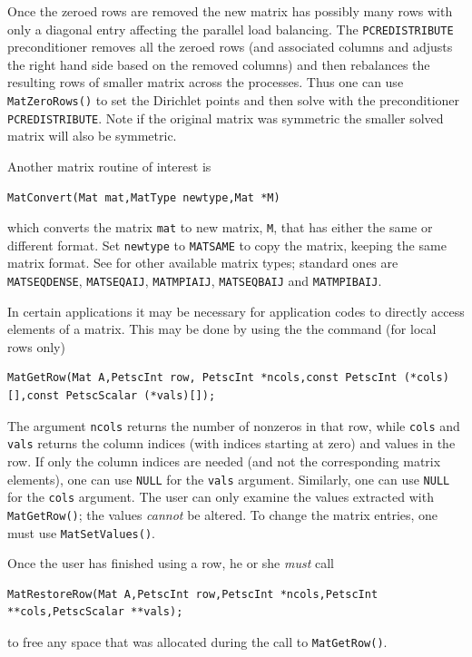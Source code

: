 Once the zeroed rows are removed the new matrix has possibly many rows
with only a diagonal entry affecting the parallel load balancing. The
\lstinline{PCREDISTRIBUTE} preconditioner removes all the zeroed rows (and
associated columns and adjusts the right hand side based on the
removed columns) and then rebalances the resulting rows of smaller
matrix across the processes. Thus one can use \lstinline{MatZeroRows()} to set the Dirichlet points and then solve with the preconditioner \lstinline{PCREDISTRIBUTE}. Note if the original matrix was symmetric the
smaller solved matrix will also be symmetric.

Another matrix routine of interest is
\begin{lstlisting}
MatConvert(Mat mat,MatType newtype,Mat *M)
\end{lstlisting}
which converts the matrix \lstinline{mat} to new matrix, \lstinline{M}, that has
either the same or different format.  Set \lstinline{newtype} to \lstinline{MATSAME}
to copy the matrix, keeping the same matrix format.  See
\href{https://www.mcs.anl.gov/petsc/petsc-current/include/petscmat.h.html}{} for other available matrix types;
standard ones are \lstinline{MATSEQDENSE}, \lstinline{MATSEQAIJ}, \lstinline{MATMPIAIJ},
               \lstinline{MATSEQBAIJ} and \lstinline{MATMPIBAIJ}.

In certain applications it may be necessary for application codes
to directly access elements of a matrix. This may be done by using the
the command (for local rows only)
\begin{lstlisting}
MatGetRow(Mat A,PetscInt row, PetscInt *ncols,const PetscInt (*cols)[],const PetscScalar (*vals)[]);
\end{lstlisting}
The argument \lstinline{ncols} returns the number of nonzeros in that row,
while \lstinline{cols} and \lstinline{vals} returns the column indices (with indices
starting at zero) and values in the row. If only the column
indices are needed (and not the corresponding matrix elements), one
can use \lstinline{NULL} for the \lstinline{vals} argument. Similarly,
one can use \lstinline{NULL} for the \lstinline{cols} argument.
The user can only examine the values extracted with \lstinline{MatGetRow()};
the values {\em cannot} be altered.
To change the matrix entries, one must use \lstinline{MatSetValues()}.

Once the user has finished using a row, he or she {\em must} call
\begin{lstlisting}
MatRestoreRow(Mat A,PetscInt row,PetscInt *ncols,PetscInt **cols,PetscScalar **vals);
\end{lstlisting}
to free any space that was allocated during the call to \lstinline{MatGetRow()}.

